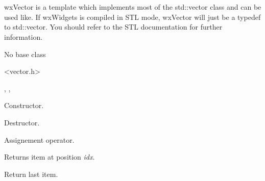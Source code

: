 \section{}\label{wxvector}

wxVector is a template which implements most of the std::vector
class and can be used like. If wxWidgets is compiled in STL mode,
wxVector will just be a typedef to std::vector. You should
refer to the STL documentation for further information.


No base class


<vector.h>


, 
,

\label{wxvectorwxvector}



Constructor.

\label{wxvectordtor}


Destructor.

\label{wxvectoroperatorassign}


Assignement operator.

\label{wxvectorat}



Returns item at position {\it idx}.

\label{wxvectorback}



Return last item.

\label{wxvectorbegin}

